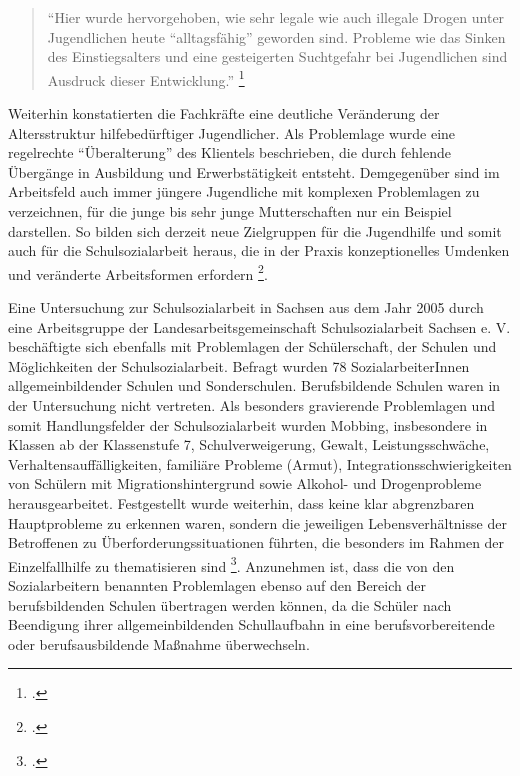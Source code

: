 \begin{quotation}
\noindent
"`Hier wurde hervorgehoben, wie sehr legale wie auch illegale Drogen unter Jugendlichen heute "`alltagsfähig"' geworden sind. Probleme wie das Sinken des Einstiegsalters und eine gesteigerten Suchtgefahr bei Jugendlichen sind Ausdruck dieser Entwicklung."' \footcite[vgl.][142ff]{UniversitaetLeipzig2007}
\end{quotation}

\noindent
Weiterhin konstatierten die Fachkräfte eine deutliche Veränderung der Altersstruktur hilfebedürftiger Jugendlicher. Als Problemlage wurde eine regelrechte "`Überalterung"' des Klientels beschrieben, die durch fehlende Übergänge in Ausbildung und Erwerbstätigkeit entsteht. Demgegenüber sind im Arbeitsfeld auch immer jüngere Jugendliche mit komplexen Problemlagen zu verzeichnen, für die junge bis sehr junge Mutterschaften nur ein Beispiel darstellen. So bilden sich derzeit neue Zielgruppen für die Jugendhilfe und somit auch für die Schulsozialarbeit heraus, die in der Praxis konzeptionelles Umdenken und veränderte Arbeitsformen erfordern \footcite[vgl.][142ff]{UniversitaetLeipzig2007}.
 
Eine Untersuchung zur Schulsozialarbeit in Sachsen aus dem Jahr 2005 durch eine Arbeitsgruppe der Landesarbeitsgemeinschaft Schulsozialarbeit Sachsen e. V. beschäftigte sich ebenfalls mit Problemlagen der Schülerschaft, der Schulen und Möglichkeiten der Schulsozialarbeit. Befragt wurden 78 SozialarbeiterInnen allgemeinbildender Schulen und Sonderschulen. Berufsbildende Schulen waren in der Untersuchung nicht vertreten. Als besonders gravierende Problemlagen und somit Handlungsfelder der Schulsozialarbeit wurden Mobbing, insbesondere in Klassen ab der Klassenstufe 7, Schulverweigerung, Gewalt, Leistungsschwäche, Verhaltensauffälligkeiten, familiäre Probleme (Armut), Integrationsschwierigkeiten von Schülern mit Migrationshintergrund sowie Alkohol- und Drogenprobleme herausgearbeitet. Festgestellt wurde weiterhin, dass keine klar abgrenzbaren Hauptprobleme zu erkennen waren, sondern die jeweiligen Lebensverhältnisse der Betroffenen zu Überforderungssituationen führten, die besonders im Rahmen der Einzelfallhilfe zu thematisieren sind \footcite[vgl.][63ff]{Lang2010}. Anzunehmen ist, dass die von den Sozialarbeitern benannten Problemlagen ebenso auf den Bereich der berufsbildenden Schulen übertragen werden können, da die Schüler nach Beendigung ihrer allgemeinbildenden Schullaufbahn in eine berufsvorbereitende oder berufsausbildende Maßnahme überwechseln.


